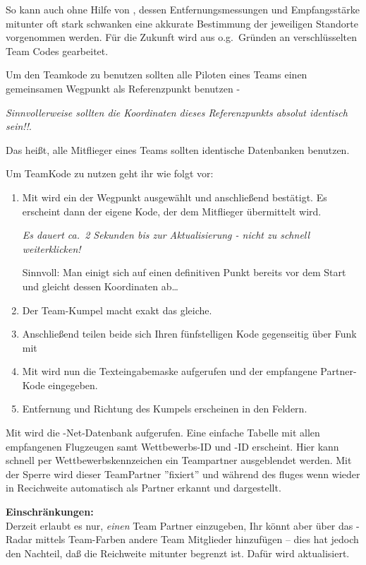So kann  auch ohne Hilfe von  \fl, dessen Entfernungsmessungen und Empfangsstärke
mitunter oft stark schwanken  eine akkurate Bestimmung der jeweiligen Standorte vorgenommen werden.
Für die Zukunft wird aus o.g.\ Gründen an verschlüsselten Team Codes gearbeitet.

Um den Teamkode zu benutzen sollten alle Piloten eines Teams einen gemeinsamen Wegpunkt als Referenzpunkt
benutzen - 

\textsl{Sinnvollerweise sollten die Koordinaten  dieses Referenzpunkts absolut identisch sein!!}.


Das heißt, alle Mitflieger eines Teams sollten identische Datenbanken benutzen.


Um TeamKode zu nutzen geht ihr wie folgt vor:
\begin{enumerate}
\item Mit  wird ein der Wegpunkt ausgewählt und anschließend bestätigt.
Es erscheint dann der eigene Kode, der dem Mitflieger übermittelt wird. 

\achtung \textsl{Es dauert ca.\ 2 Sekunden bis zur Aktualisierung - nicht zu schnell weiterklicken!}

Sinnvoll: 
Man einigt sich auf einen definitiven Punkt bereits vor dem Start und gleicht dessen Koordinaten ab\dots
\item Der Team-Kumpel macht exakt das gleiche.
\item Anschließend teilen beide sich Ihren fünfstelligen Kode gegenseitig über Funk mit
\item Mit  wird nun die Texteingabemaske aufgerufen und der empfangene Partner-Kode eingegeben.
\item Entfernung und Richtung des Kumpels erscheinen in den Feldern.
\end{enumerate}
Mit   wird die \fl-Net-Datenbank aufgerufen.
Eine einfache  Tabelle  mit allen empfangenen Flugzeugen samt Wettbewerbs-ID und \fl-ID erscheint.
Hier kann schnell per Wettbewerbskennzeichen ein Teampartner ausgeblendet  werden.
Mit der Sperre wird dieser TeamPartner ''fixiert'' und während des fluges wenn wieder in Recichweite automatisch als Partner erkannt und dargestellt.

\textbf{Einschränkungen:}\\
Derzeit erlaubt  es \xc nur, \textsl{einen} Team Partner einzugeben, Ihr könnt aber über
das \fl-Radar mittels Team-Farben andere Team Mitglieder hinzufügen -- dies hat jedoch den Nachteil,
daß die Reichweite mitunter begrenzt ist. Dafür wird aktualisiert.

